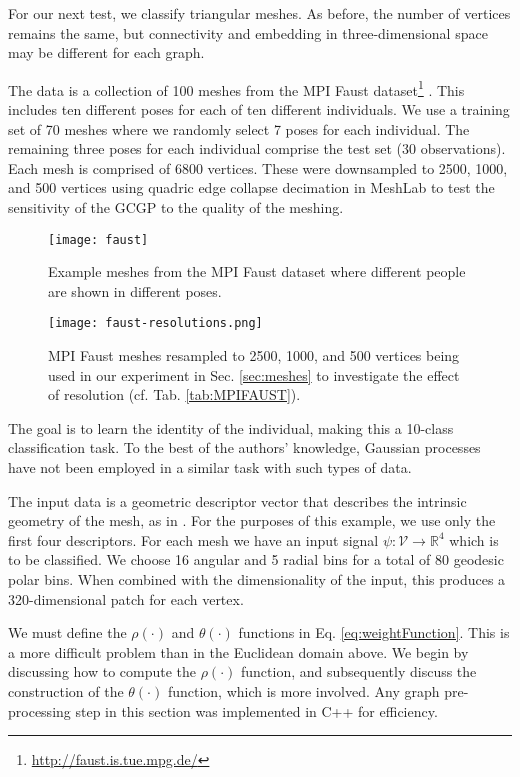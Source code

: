 \documentclass{article}
\begin{document}
For our next test, we classify triangular meshes. As before, the number of vertices remains the same, but connectivity and embedding in three-dimensional space may be different for each graph.


The data is a collection of 100 meshes from the MPI Faust dataset\footnote{\url{http://faust.is.tue.mpg.de/}} \cite{faust}. This includes ten different poses for each of ten different individuals. We use a training set of 70 meshes where we randomly select 7 poses for each individual. The remaining three poses for each individual comprise the test set (30 observations). Each mesh is comprised of 6800 vertices. These were downsampled to 2500, 1000, and 500 vertices using quadric edge collapse decimation in MeshLab \citep{meshlab} to test the sensitivity of the GCGP to the quality of the meshing.


\begin{figure}
\centering
\texttt{[image: faust]}
\caption{Example meshes from the MPI Faust dataset where different people are shown in different poses.}
\end{figure}

\begin{figure}[t]
\centering
\texttt{[image: faust-resolutions.png]}
\caption{MPI Faust meshes resampled to 2500, 1000, and 500 vertices being used in our experiment in Sec. \ref{sec:meshes} to investigate the effect of resolution (cf. Tab. \ref{tab:MPIFAUST}).}
\end{figure}

The goal is to learn the identity of the individual, making this a 10-class classification task. To the best of the authors' knowledge, Gaussian processes have not been employed in a similar task with such types of data.

The input data is a geometric descriptor vector that describes the intrinsic geometry of the mesh, as in \citet{descriptors}. For the purposes of this example, we use only the first four descriptors. For each mesh we have an input signal $\psi: \mathcal{V} \to \mathbb{R}^4$ which is to be classified. We choose 16 angular and 5 radial bins for a total of 80 geodesic polar bins. When combined with the dimensionality of the input, this produces a 320-dimensional patch for each vertex.

We must define the $\rho(\cdot)$ and $\theta(\cdot)$ functions in Eq. \eqref{eq:weightFunction}. This is a more difficult problem than in the Euclidean domain above. We begin by discussing how to compute the $\rho(\cdot)$ function, and subsequently discuss the construction of the $\theta(\cdot)$ function, which is more involved. Any graph pre-processing step in this section was implemented in C++ for efficiency. 
\end{document}
